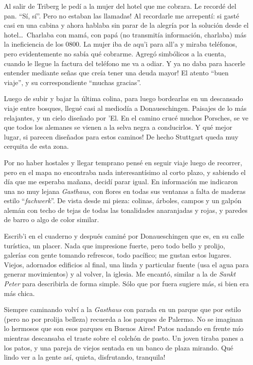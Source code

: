 Al salir de Triberg le ped\'i a la mujer del hotel que me cobrara. Le
record\'e del pan. ``S\'i, s\'i''. \textexclamdown Pero no estaban las
llamadas! Al recordarle me arrepent\'i: si gast\'e casi 
en una cabina y ahora hablaba sin parar de la alegr\'ia por la soluci\'on
desde el hotel\ldots\ Charlaba con mam\'a, con pap\'a (no transmit\'ia
informaci\'on, charlaba) m\'as la ineficiencia de los 0800. La mujer iba de
aqu'i para all'a y miraba tel\'efonos, pero evidentemente no sab\'ia qu\'e
cobrarme. Agreg\'o  simb\'olicos a la cuenta, cuando le llegue
la factura del tel\'efono me va a odiar. \textexclamdown Y ya no daba para
hacerle entender mediante se\~nas que cre\'ia tener una deuda mayor! El atento
``buen viaje'', y su correspondiente ``muchas gracias''.

Luego de subir y bajar la \'ultima colina, para luego bordearlas en un
descansado viaje entre bosques, llegu\'e casi al mediod\'ia a Donaueschingen.
Paisajes de lo m\'as relajantes, y un cielo dise\~nado por 'El. En el camino
cruc\'e muchos Porsches, se ve que todos los alemanes se vienen a la selva
negra a conducirlos. \textexclamdown Y qu\'e mejor lugar, si parecen
dise\~nados para estos caminos! De hecho Stuttgart queda muy cerquita de esta
zona.

Por no haber hostales y llegar temprano pens\'e en seguir viaje luego de
recorrer, pero en el mapa no encontraba nada interesant\'isimo al corto plazo,
y sabiendo el d\'ia que me esperaba ma\~nana, decid\'i parar igual. En
informaci\'on me indicaron una no muy lejana \emph{Gasthaus}, con flores en
todas sus ventanas a falta de maderas estilo ``\emph{fachwerk}''. De vista
desde mi pieza: colinas, \'arboles, campos y un galp\'on alem\'an con techo de
tejas de todas las tonalidades anaranjadas y rojas, y paredes de barro o algo
de color similar.

Escrib'i en el cuaderno y despu\'es
camin\'e por Donaueschingen que es, en su calle tur\'istica, un placer. Nada
que impresione fuerte, pero todo bello y prolijo, galer\'ias con gente tomando
refrescos, todo pac\'ifico; me gustan estos lugares. Viejos, adornados
edificios al final, una linda y particular fuente (usa el agua para generar
movimientos) y al volver, la iglesia. Me encant\'o, similar a la de
\emph{Sankt Peter} para describirla de forma simple. S\'olo que por fuera
sugiere m\'as, si bien era m\'as chica.

Siempre caminando volv\'i a la \emph{Gasthaus} con parada en un parque que por
estilo (pero no por prolija belleza) recuerda a los parques de Palermo.
\textexclamdown No se imaginan lo hermosos que son esos parques en Buenos
Aires! Patos nadando en frente m\'io mientras descansaba el traste sobre
el colch\'on de pasto. Un joven tiraba panes a los patos, y una pareja de
viejos sentada en un banco de plaza mirando. \textexclamdown Qu\'e lindo ver a
la gente as\'i, quieta, disfrutando, tranquila!

